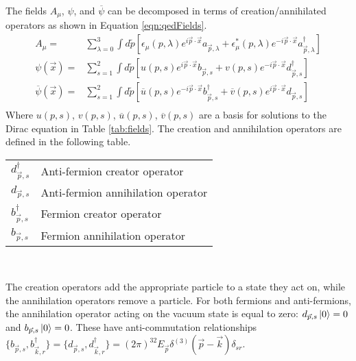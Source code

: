 The fields $A_\mu$, $\psi$, and $\overline{\psi}$ can be decomposed in terms of creation/annihilated operators as shown in Equation \ref{eqn:qedFields}.
\begin{equation}\begin{split}\label{eqn:qedFields}
A_\mu=&\sum_{\lambda=0}^3\int d\tilde{p}[\epsilon_\mu(p,\lambda)e^{i\vec{p}\cdot\vec{x}}a_{\vec{p},\lambda}+\epsilon^*_\mu(p,\lambda)e^{-i\vec{p}\cdot\vec{x}}a^\dagger_{\vec{p},\lambda}] \\
\psi(\vec{x})=&\sum_{s=1}^2\int d\tilde{p}[u(p,s)e^{i\vec{p}\cdot\vec{x}}b_{\vec{p},s}+v(p,s)e^{-i\vec{p}\cdot\vec{x}}d^\dagger_{\vec{p},s}] \\
\overline{\psi}(\vec{x})=&\sum_{s=1}^2\int d\tilde{p}[\overline{u}(p,s)e^{-i\vec{p}\cdot\vec{x}}b^\dagger_{\vec{p},s}+\overline{v}(p,s)e^{i\vec{p}\cdot\vec{x}}d_{\vec{p},s}] \\
\end{split}\end{equation}
Where $u(p,s)$, $v(p,s)$, $\overline{u}(p,s)$, $\overline{v}(p,s)$ are a basis for solutions to the Dirac equation in Table \ref{tab:fields}.
The creation and annihilation operators are defined in the following table. \\
    \begin{center}
        \begin{tabular}{l l}\toprule
        $d_{\vec{p},s}^\dagger$ & Anti-fermion creator operator \\
        $d_{\vec{p},s}$ & Anti-fermion annihilation operator    \\
        $b_{\vec{p},s}^\dagger$ & Fermion creator operator \\
        $b_{\vec{p},s}$ & Fermion annihilation operator    \\
        \bottomrule\end{tabular} \\
    \end{center}
\vspace{1em}
The creation operators add the appropriate particle to a state they act on, while the annihilation operators remove a particle.
For both fermions and anti-fermions, the annihilation operator acting on the vacuum state is equal to zero: $d_{\vec{p},s}\ket{0}=0$ and $b_{\vec{p},s}\ket{0}=0$.
These have anti-commutation relationships \mbox{$\{b_{\vec{p},s},b_{\vec{k},r}^\dagger\}=\{d_{\vec{p},s},d_{\vec{k},r}^\dagger\}=(2\pi)^32E_{\vec{p}}\delta^{(3)}(\vec{p}-\vec{k})\delta_{sr}$}.

